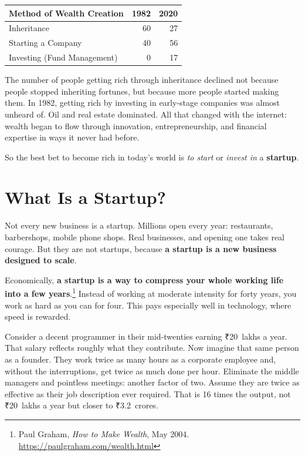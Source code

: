\smallskip
\begin{center}
\begin{tabular}{lrr}
\toprule
Method of Wealth Creation & 1982 & 2020 \\
\midrule
Inheritance                 &  60  &  27  \\
Starting a Company          &  40  &  56  \\
Investing (Fund Management) &   0  &  17  \\
\bottomrule
\end{tabular}
\end{center}
\smallskip

The number of people getting rich through inheritance declined not because people stopped inheriting fortunes, but because more people started making them. In 1982, getting rich by investing in early-stage companies was almost unheard of. Oil and real estate dominated. All that changed with the internet: wealth began to flow through innovation, entrepreneurship, and financial expertise in ways it never had before.

So the best bet to become rich in today's world is \emph{to start} or \emph{invest in} a \textbf{startup}.

\section{What Is a Startup?}
\label{sec:ch01-what-is-a-startup}

Not every new business is a startup. Millions open every year: restaurants, barbershops, mobile phone shops. Real businesses, and opening one takes real courage. But they are not startups, because \textbf{a startup is a new business designed to scale}.

Economically, \textbf{a startup is a way to compress your whole working life into a few years}.\footnote{Paul Graham, \emph{How to Make Wealth}, May 2004. \url{https://paulgraham.com/wealth.html}} Instead of working at moderate intensity for forty years, you work as hard as you can for four. This pays especially well in technology, where speed is rewarded.

Consider a decent programmer in their mid-twenties earning \mbox{₹20 lakhs} a year. That salary reflects roughly what they contribute. Now imagine that same person as a founder. They work twice as many hours as a corporate employee and, without the interruptions, get twice as much done per hour. Eliminate the middle managers and pointless meetings: another factor of two. Assume they are twice as effective as their job description ever required. That is 16 times the output, not \mbox{₹20 lakhs} a year but closer to \mbox{₹3.2 crores}.

